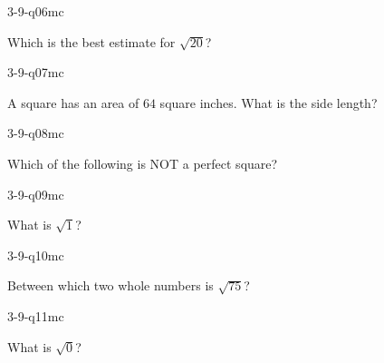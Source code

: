 \begin{practiceQuestion}{3-9-q06}{mc}
\begin{questionText}
Which is the best estimate for $\sqrt{20}$?
\end{questionText}
\end{practiceQuestion}

\begin{practiceQuestion}{3-9-q07}{mc}
\begin{questionText}
A square has an area of $64$ square inches. What is the side length?
\end{questionText}
\end{practiceQuestion}

\begin{practiceQuestion}{3-9-q08}{mc}
\begin{questionText}
Which of the following is NOT a perfect square?
\end{questionText}
\end{practiceQuestion}

\begin{practiceQuestion}{3-9-q09}{mc}
\begin{questionText}
What is $\sqrt{1}$?
\end{questionText}
\end{practiceQuestion}

\begin{practiceQuestion}{3-9-q10}{mc}
\begin{questionText}
Between which two whole numbers is $\sqrt{75}$?
\end{questionText}
\end{practiceQuestion}

\begin{practiceQuestion}{3-9-q11}{mc}
\begin{questionText}
What is $\sqrt{0}$?
\end{questionText}
\end{practiceQuestion}

